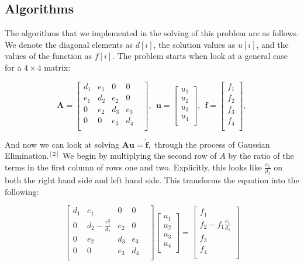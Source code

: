 \documentclass{article}
\begin{document}
\subsection{Algorithms}
The algorithms that we implemented in the solving of this problem are as follows. We denote the diagonal elements as $d[i]$, the solution values as $u[i]$, and the values of the function as $f[i]$. The problem starts when look at a general case for a $4\times 4$ matrix:

\[
\mathbf{A} = \begin{bmatrix}
d_{1}& e_{1}& 0& 0& \\
e_{1}& d_{2}& e_{2}& 0& \\
0& e_{2}& d_{3}& e_{3}& \\
0& 0& e_{3}& d_{4}& \\
\end{bmatrix},
\
\
\mathbf{u} = \begin{bmatrix}
u_{1}\\
u_{2} \\
u_{3}\\
u_{4}\\
\end{bmatrix},
\
\
\mathbf{f} = \begin{bmatrix}
f_{1}\\
f_{2} \\
f_{3}\\
f_{4}\\
\end{bmatrix},
\]

And now we can look at solving $\mathbf{A}\mathbf{u} = \tilde{\mathbf{f}},$ through the process of Gaussian Elimination.$^{[2]}$ We begin by multiplying the second row of $A$ by the ratio of the terms in the first column of rows one and two. Explicitly, this looks like $\frac{e_{1}}{d_{1}}$ on both the right hand side and left hand side. This transforms the equation into the following: 

\[
\begin{bmatrix}
d_{1}& e_{1}& 0& 0& \\
0& d_{2}-\frac{e_{1}^{2}}{d_{1}}& e_{2}& 0& \\
0& e_{2}& d_{3}& e_{3}& \\
0& 0& e_{3}& d_{4}& \\
\end{bmatrix}
\begin{bmatrix}
u_{1}\\
u_{2} \\
u_{3}\\
u_{4}\\
\end{bmatrix}
=
\begin{bmatrix}
f_{1}\\
f_{2} - f_{1} \frac{e_{1}}{d_{1}} \\
f_{3}\\
f_{4}\\
\end{bmatrix}
\]
\end{document}
